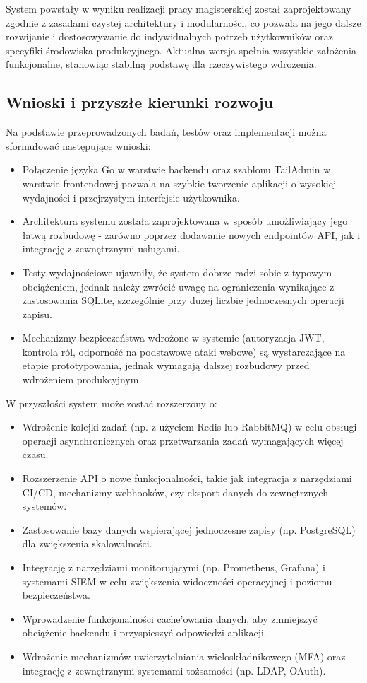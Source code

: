 System powstały w wyniku realizacji pracy magisterskiej został zaprojektowany zgodnie z zasadami czystej architektury i modularności, co pozwala na jego dalsze rozwijanie i dostosowywanie do indywidualnych potrzeb użytkowników oraz specyfiki środowiska produkcyjnego. Aktualna wersja spełnia wszystkie założenia funkcjonalne, stanowiąc stabilną podstawę dla rzeczywistego wdrożenia.

\subsection{Wnioski i przyszłe kierunki rozwoju}

Na podstawie przeprowadzonych badań, testów oraz implementacji można sformułować następujące wnioski:

\begin{itemize}
    \item Połączenie języka Go w warstwie backendu oraz szablonu TailAdmin w warstwie frontendowej pozwala na szybkie tworzenie aplikacji o wysokiej wydajności i przejrzystym interfejsie użytkownika.
    \item Architektura systemu została zaprojektowana w sposób umożliwiający jego łatwą rozbudowę - zarówno poprzez dodawanie nowych endpointów API, jak i integrację z zewnętrznymi usługami.
    \item Testy wydajnościowe ujawniły, że system dobrze radzi sobie z typowym obciążeniem, jednak należy zwrócić uwagę na ograniczenia wynikające z zastosowania SQLite, szczególnie przy dużej liczbie jednoczesnych operacji zapisu.
    \item Mechanizmy bezpieczeństwa wdrożone w systemie (autoryzacja JWT, kontrola ról, odporność na podstawowe ataki webowe) są wystarczające na etapie prototypowania, jednak wymagają dalszej rozbudowy przed wdrożeniem produkcyjnym.
\end{itemize}

W przyszłości system może zostać rozszerzony o:

\begin{itemize}
    \item Wdrożenie kolejki zadań (np. z użyciem Redis lub RabbitMQ) w celu obsługi operacji asynchronicznych oraz przetwarzania zadań wymagających więcej czasu.
    \item Rozszerzenie API o nowe funkcjonalności, takie jak integracja z narzędziami CI/CD, mechanizmy webhooków, czy eksport danych do zewnętrznych systemów.
    \item Zastosowanie bazy danych wspierającej jednoczesne zapisy (np. PostgreSQL) dla zwiększenia skalowalności.
    \item Integrację z narzędziami monitorującymi (np. Prometheus, Grafana) i systemami SIEM w celu zwiększenia widoczności operacyjnej i poziomu bezpieczeństwa.
    \item Wprowadzenie funkcjonalności cache'owania danych, aby zmniejszyć obciążenie backendu i przyspieszyć odpowiedzi aplikacji.
    \item Wdrożenie mechanizmów uwierzytelniania wieloskładnikowego (MFA) oraz integrację z zewnętrznymi systemami tożsamości (np. LDAP, OAuth).
\end{itemize}

